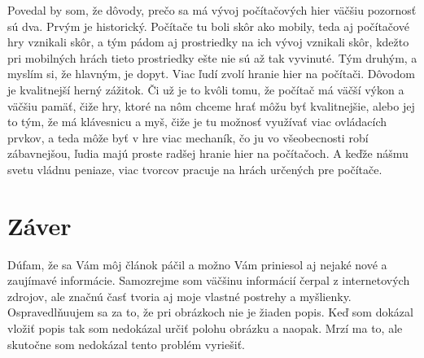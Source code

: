 \documentclass[10pt,twoside,slovak,a4paper]{article}
\begin{document}
Povedal by som, že dôvody, prečo sa má vývoj počítačových hier väčšiu pozornosť sú dva. Prvým je historický. Počítače tu boli skôr ako mobily, teda aj počítačové hry vznikali skôr, a tým pádom aj prostriedky na ich vývoj vznikali skôr, kdežto pri mobilných hrách tieto prostriedky ešte nie sú až tak vyvinuté. Tým druhým, a myslím si, že hlavným, je dopyt. Viac ľudí zvolí hranie hier na počítači. Dôvodom je kvalitnejší herný zážitok. Či už je to kvôli tomu, že počítač má väčší výkon a väčšiu pamäť, čiže hry, ktoré na nôm chceme hrať môžu byť kvalitnejšie, alebo jej to tým, že má klávesnicu a myš, čiže je tu možnosť využívať viac ovládacích prvkov, a teda môže byť v hre viac mechaník, čo ju vo všeobecnosti robí zábavnejšou, ľudia majú proste radšej hranie hier na počítačoch. A keďže nášmu svetu vládnu peniaze, viac tvorcov pracuje na hrách určených pre počítače.

\section{Záver} \label{zaver}
Dúfam, že sa Vám môj článok páčil a možno Vám priniesol aj nejaké nové a zaujímavé informácie. Samozrejme som väčšinu informácií čerpal z internetových zdrojov, ale značnú časť tvoria aj moje vlastné postrehy a myšlienky. Ospravedlňuujem sa za to, že pri obrázkoch nie je žiaden popis. Keď som dokázal vložiť popis tak som nedokázal určiť polohu obrázku a naopak. Mrzí ma to, ale skutočne som nedokázal tento problém vyriešiť.



 
\end{document}
